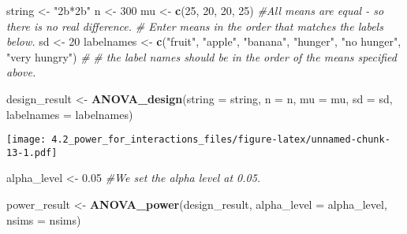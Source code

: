\documentclass[]{article}
\newenvironment{Shaded}{\begin{snugshade}}{\end{snugshade}}
\newcommand{\KeywordTok}[1]{\textcolor[rgb]{0.13,0.29,0.53}{\textbf{#1}}}
\newcommand{\DataTypeTok}[1]{\textcolor[rgb]{0.13,0.29,0.53}{#1}}
\newcommand{\DecValTok}[1]{\textcolor[rgb]{0.00,0.00,0.81}{#1}}
\newcommand{\FloatTok}[1]{\textcolor[rgb]{0.00,0.00,0.81}{#1}}
\newcommand{\StringTok}[1]{\textcolor[rgb]{0.31,0.60,0.02}{#1}}
\newcommand{\CommentTok}[1]{\textcolor[rgb]{0.56,0.35,0.01}{\textit{#1}}}
\newcommand{\NormalTok}[1]{#1}
\begin{document}
\begin{Shaded}
\begin{Highlighting}[]
\NormalTok{string <-}\StringTok{ "2b*2b"}
\NormalTok{n <-}\StringTok{ }\DecValTok{300}
\NormalTok{mu <-}\StringTok{ }\KeywordTok{c}\NormalTok{(}\DecValTok{25}\NormalTok{, }\DecValTok{20}\NormalTok{, }\DecValTok{20}\NormalTok{, }\DecValTok{25}\NormalTok{) }\CommentTok{#All means are equal - so there is no real difference.}
\CommentTok{# Enter means in the order that matches the labels below.}
\NormalTok{sd <-}\StringTok{ }\DecValTok{20}
\NormalTok{labelnames <-}\StringTok{ }\KeywordTok{c}\NormalTok{(}\StringTok{"fruit"}\NormalTok{, }\StringTok{"apple"}\NormalTok{, }\StringTok{"banana"}\NormalTok{, }\StringTok{"hunger"}\NormalTok{, }\StringTok{"no hunger"}\NormalTok{, }\StringTok{"very hungry"}\NormalTok{) }\CommentTok{#}
\CommentTok{# the label names should be in the order of the means specified above.}

\NormalTok{design_result <-}\StringTok{ }\KeywordTok{ANOVA_design}\NormalTok{(}\DataTypeTok{string =}\NormalTok{ string,}
                   \DataTypeTok{n =}\NormalTok{ n, }
                   \DataTypeTok{mu =}\NormalTok{ mu, }
                   \DataTypeTok{sd =}\NormalTok{ sd, }
                   \DataTypeTok{labelnames =}\NormalTok{ labelnames)}
\end{Highlighting}
\end{Shaded}

\texttt{[image: 4.2\_power\_for\_interactions\_files/figure-latex/unnamed-chunk-13-1.pdf]}

\begin{Shaded}
\begin{Highlighting}[]
\NormalTok{alpha_level <-}\StringTok{ }\FloatTok{0.05} \CommentTok{#We set the alpha level at 0.05. }

\NormalTok{power_result <-}\StringTok{ }\KeywordTok{ANOVA_power}\NormalTok{(design_result, }\DataTypeTok{alpha_level =}\NormalTok{ alpha_level, }\DataTypeTok{nsims =}\NormalTok{ nsims)}
\end{Highlighting}
\end{Shaded}
\end{document}
